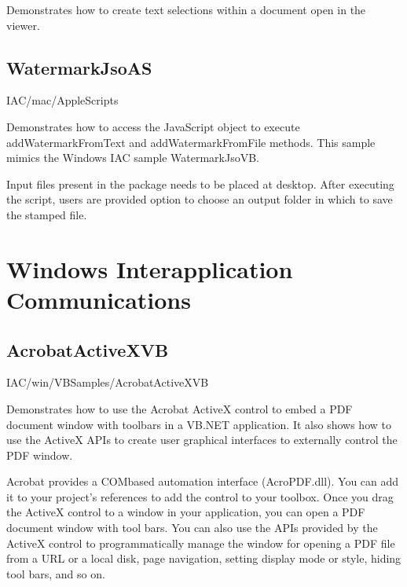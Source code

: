 \documentclass[letterpaper,12pt,english,openany,oneside]{sphinxmanual}
\begin{document}
Demonstrates how to create text selections within a document open in the viewer.


\section{WatermarkJsoAS}
\label{\detokenize{Samples_MacintoshIAC:watermarkjsoas}}\label{\detokenize{Samples_MacintoshIAC:location-5}}

IAC/mac/AppleScripts

\label{\detokenize{Samples_MacintoshIAC:description-5}}

Demonstrates how to access the JavaScript object to execute addWatermarkFromText and addWatermarkFromFile methods. This sample mimics the Windows IAC sample WatermarkJsoVB.

Input files present in the package needs to be placed at desktop. After executing the script, users are provided option to choose an output folder in which to save the stamped file.


\chapter{Windows \sphinxhyphen{} Interapplication Communications}
\label{\detokenize{Samples_WindowsIAC:windows-interapplication-communications}}\label{\detokenize{Samples_WindowsIAC::doc}}

\section{AcrobatActiveXVB}
\label{\detokenize{Samples_WindowsIAC:acrobatactivexvb}}

IAC/win/VBSamples/AcrobatActiveXVB


Demonstrates how to use the Acrobat ActiveX control to embed a PDF document window with toolbars in a VB.NET application. It also shows how to use the ActiveX APIs to create user graphical interfaces to externally control the PDF window.

Acrobat provides a COM\sphinxhyphen{}based automation interface (AcroPDF.dll). You can add it to your project’s references to add the control to your toolbox. Once you drag the ActiveX control to a window in your application, you can open a PDF document window with tool bars. You can also use the APIs provided by the ActiveX control to programmatically manage the window for opening a PDF file from a URL or a local disk, page navigation, setting display mode or style, hiding tool bars, and so on.
\end{document}
